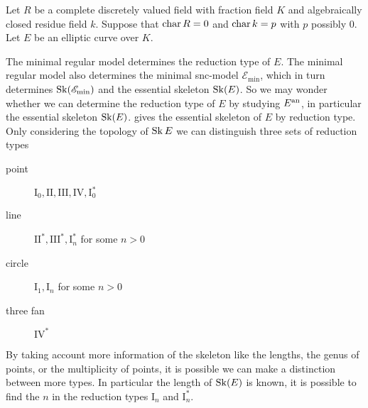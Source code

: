 Let $R$ be a complete discretely valued field with fraction field $K$ and algebraically closed residue field $k$. Suppose that  $\operatorname{char} R = 0$ and $\operatorname{char} k = p$ with $p$ possibly $0$. 
Let $E$ be an elliptic curve over $K$.

The minimal regular model determines the reduction type of $E$. 
The minimal regular model also determines the minimal snc-model $\mathscr E_\text{min} $, which in turn determines $\operatorname{Sk}(\mathscr E_\text{min} )$ and the essential skeleton $\operatorname{Sk}(E)$. 
So we may wonder whether we can determine the reduction type of $E$ by studying $E{}^{\text{an}}$, in particular the essential skeleton $\operatorname{Sk}(E)$.
 gives the essential skeleton of $E$ by reduction type. 
Only considering the topology of $\operatorname{Sk} E$ we can distinguish three sets of reduction types 
\begin{description}
	\item[point] $\mathrm I_0, \mathrm{II}, \mathrm{III},\mathrm{IV}, \mathrm{I}_0^*$ 
	\item[line] $\mathrm{II}^*, \mathrm{III}^*, \mathrm{I}_n^*$ for some $n > 0$
	\item[circle]  $\mathrm{I}_1, \mathrm{I}_n$ for some  $n > 0$
	\item[three fan] $\mathrm {IV}^*$
\end{description}
By taking account more information of the skeleton like the lengths, the genus of points, or the multiplicity of points, it is possible we can make a distinction between more types.
In particular the length of $\operatorname{Sk}(E)$ is known, it is possible to find the $n$ in the reduction types $\mathrm I_n$ and $\mathrm I_n^*$. 


